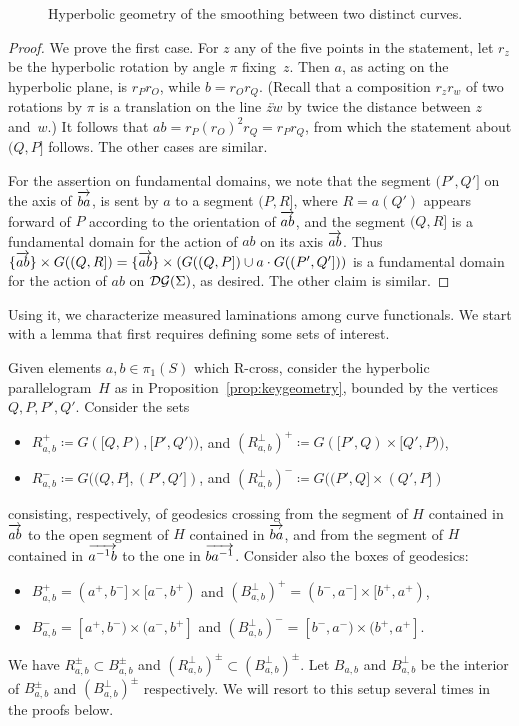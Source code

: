   \begin{figure}
\caption{Hyperbolic geometry of the smoothing between two distinct curves.}
\label{fig:smoothing_1}
\end{figure}



\begin{proof}
  We prove the first case.
  For $z$ any of the five points in the statement, let $r_z$ be
  the hyperbolic rotation by angle $\pi$ fixing~$z$. Then $a$, as
  acting on the hyperbolic plane, is $r_P r_O$, while $b = r_O r_Q$.
  (Recall that a composition $r_zr_w$ of two rotations by $\pi$ is a
  translation on the line $\overleftrightarrow{zw}$ by twice the
  distance between $z$ and~$w$.)
  It follows that $ab = r_P (r_O)^2 r_Q =
  r_Pr_Q$, from which the statement about $(Q,P]$
  follows. The other cases are similar.

For the assertion on fundamental domains, we note that the segment
$(P',Q']$ on the axis of $\overrightarrow{ba}$, is sent by $a$ to a segment
$(P,R]$, where $R=a(Q')$ appears forward of $P$ according to the
orientation of $\overrightarrow{ab}$, and the segment $(Q,R]$ is a fundamental
domain for the action of $ab$ on its axis $\overrightarrow{ab}$. Thus $\{
\overrightarrow{ab} \} \times G((Q,R])= \{ \overrightarrow{ab} \} \times  (G((Q,P]) \cup a
\cdot G((P',Q']))$ is a fundamental domain for the action of $ab$ on
$\operatorname{\mathcal{D}\mathcal{G}}(\Sigma)$, as desired.
The other claim is similar.
\end{proof}

Using it, we characterize measured laminations among curve
functionals.
We start with a  lemma that first requires defining some sets of interest.

Given elements $a, b \in \pi_1(S)$ which R-cross,
consider the hyperbolic parallelogram~$H$ as in Proposition~\ref{prop:keygeometry}, bounded by the vertices $Q,P,P',Q'$.
Consider the sets
\begin{itemize} \item $R_{a,b}^+ \coloneqq G([Q,P), [P', Q'))$, and $(R_{a,b}^{\perp})^+ \coloneqq G([P',Q) \times [Q', P))$, 
\item $R_{a,b}^- \coloneqq G((Q,P], (P', Q'])$, and $(R_{a,b}^{\perp})^- \coloneqq G((P',Q] \times (Q', P])$
\end{itemize}
consisting, respectively, of geodesics crossing from the segment of $H$ contained in $\overrightarrow{ab}$ to the open segment of $H$ contained in $\overrightarrow{ba}$, and from the segment of $H$ contained in $\overrightarrow{a^{-1}b}$ to the one in $\overrightarrow{ba^{-1}}$.
Consider also the boxes of geodesics:
\begin{itemize} \item $B_{a,b}^+ = (a^+, b^-] \times [a^-, b^+)$ and  $(B_{a,b}^{\perp})^+ = (b^-, a^-] \times [b^+, a^+)$, 
\item $B_{a,b}^- = [a^+, b^-) \times (a^-, b^+]$ and   $(B_{a,b}^{\perp})^- = [b^-, a^-) \times (b^+, a^+]$.
\end{itemize}
We have $R_{a,b}^{\pm} \subset B_{a,b}^{\pm}$ and $(R_{a,b}^{\perp})^{\pm}  \subset (B_{a,b}^{\perp})^{\pm} $.
Let $B_{a,b}$ and $B_{a,b}^\perp$ be the interior of $B_{a,b}^{\pm}$ and $(B_{a,b}^{\perp})^{\pm} $ respectively.
We will resort to this setup several times in the proofs below.

